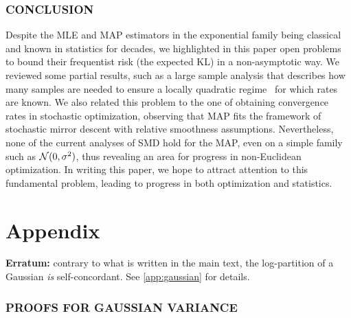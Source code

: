 \documentclass[twoside]{article}
\begin{document}
\section{CONCLUSION}
Despite the MLE and MAP estimators in the exponential family being classical and known in statistics for decades, we highlighted in this paper open problems to bound their frequentist risk (the expected KL) in a non-asymptotic way. We reviewed some partial results, such as a large sample analysis that describes how many samples are needed to ensure a locally quadratic regime~\citep{kakade2010learning, ostrovskii2021finite} for which rates are known. We also related this problem to the one of obtaining convergence rates in stochastic optimization, observing that MAP fits the framework of stochastic mirror descent with relative smoothness assumptions.
Nevertheless, none of the current analyses of SMD hold for the MAP, even on a simple family such as ${\mathcal N}(0,\sigma^2)$, thus revealing an area for progress in non-Euclidean optimization.
In writing this paper, we hope to attract attention to this fundamental problem, leading to progress in both optimization and statistics.


\nocite{dragomir2021optimal}
\newpage




\clearpage
\appendix
\onecolumn


\part{Appendix} %
\begin{important}
	{\bf Erratum:}  contrary to what is written in the main text, the log-partition of a Gaussian \emph{is} self-concordant. See \cref{app:gaussian} for details. 
\end{important}
\parttoc %

\section{PROOFS FOR GAUSSIAN VARIANCE}
\label{app:gaussian-variance}
\end{document}
